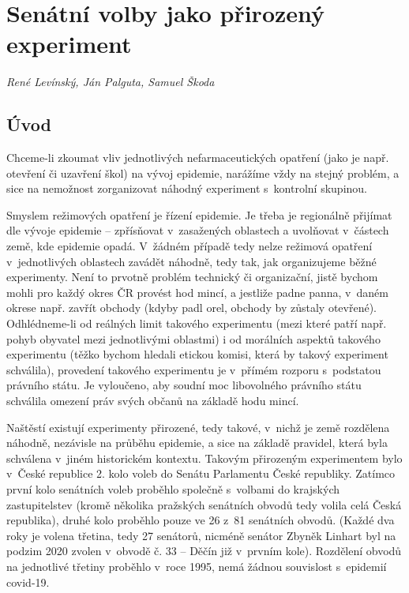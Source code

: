 
\chapter{Senátní volby jako přirozený experiment}\label{Prirozene_experimenty}

\textit{René Levínský, Ján Palguta, Samuel Škoda}

\section*{Úvod}
Chceme-li zkoumat vliv jednotlivých nefarmaceutických opatření (jako je např. otev\-ře\-ní či uzavření škol) na vývoj epidemie, narážíme vždy na stejný problém, a sice na nemožnost zorganizovat náhodný experiment s~kontrolní skupinou. 

Smyslem režimových opatření je řízení epidemie. Je třeba je regionálně přijímat dle vývoje epidemie -- zpřísňovat v~zasažených oblastech a uvolňovat v~částech země, kde epidemie opadá. V~žádném případě tedy nelze režimová opatření v~jednotlivých oblastech zavádět náhodně, tedy tak, jak organizujeme běžné experimenty. Není to prvotně problém technický či organizační, jistě bychom mohli pro každý okres ČR provést hod mincí, a jestliže padne panna, v~daném okrese např. zavřít obchody (kdyby padl orel, obchody by zůstaly otevřené). Odhlédneme-li od reálných limit takového experimentu (mezi které patří např. pohyb obyvatel mezi jednotlivými oblastmi) i od morálních aspektů takového experimentu (těžko bychom hledali etickou komisi, která by takový experiment schválila), provedení takového experimentu je v~přímém rozporu s~podstatou právního státu. Je vyloučeno, aby soudní moc libovolného právního státu schválila omezení práv svých občanů na základě hodu mincí.

Naštěstí existují experimenty přirozené, tedy takové, v~nichž je země rozdělena náhodně, nezávisle na průběhu epidemie, a sice na základě pravidel, která byla schválena v~jiném historickém kontextu. Takovým přirozeným experimentem bylo v~České republice 2. kolo voleb do Senátu Parlamentu České republiky. Zatímco první kolo senátních voleb proběhlo společně s~volbami do krajských zastupitelstev (kromě několika pražských senátních obvodů tedy volila celá Česká republika), druhé kolo proběhlo pouze ve 26 z~81 senátních obvodů. (Každé dva roky je volena třetina, tedy 27 senátorů, nicméně senátor Zbyněk Linhart byl na podzim 2020 zvolen v~obvodě č. 33 -- Děčín již v~prvním kole). Rozdělení obvodů na jednotlivé třetiny 
proběhlo v~roce 1995, nemá žádnou souvislost s~epidemií covid-19. 

